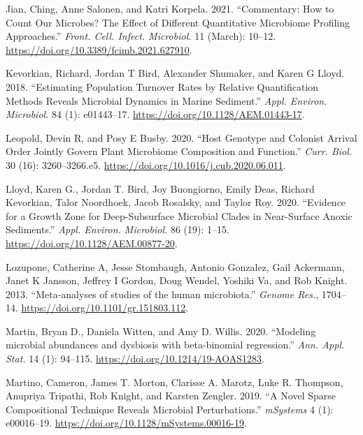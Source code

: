 \documentclass[
]{article}
\newlength{\cslhangindent}
\newlength{\cslentryspacingunit} %
\newenvironment{CSLReferences}[2] %
 {%
  \setlength{\parindent}{0pt}
  \ifodd #1
  \let\oldpar\par
  \def\par{\hangindent=\cslhangindent\oldpar}
  \fi
  \setlength{\parskip}{#2\cslentryspacingunit}
 }%
 {}
\theoremstyle{definition}
\theoremstyle{definition}
\theoremstyle{definition}
\theoremstyle{definition}
\theoremstyle{remark}
\begin{document}
\begin{CSLReferences}{1}{0}
\leavevmode{}%
Jian, Ching, Anne Salonen, and Katri Korpela. 2021. {``{Commentary: How to Count Our Microbes? The Effect of Different Quantitative Microbiome Profiling Approaches}.''} \emph{Front. Cell. Infect. Microbiol.} 11 (March): 10--12. \url{https://doi.org/10.3389/fcimb.2021.627910}.

\leavevmode{}%
Kevorkian, Richard, Jordan T Bird, Alexander Shumaker, and Karen G Lloyd. 2018. {``{Estimating Population Turnover Rates by Relative Quantification Methods Reveals Microbial Dynamics in Marine Sediment}.''} \emph{Appl. Environ. Microbiol.} 84 (1): e01443--17. \url{https://doi.org/10.1128/AEM.01443-17}.

\leavevmode{}%
Leopold, Devin R, and Posy E Busby. 2020. {``{Host Genotype and Colonist Arrival Order Jointly Govern Plant Microbiome Composition and Function}.''} \emph{Curr. Biol.} 30 (16): 3260--3266.e5. \url{https://doi.org/10.1016/j.cub.2020.06.011}.

\leavevmode{}%
Lloyd, Karen G., Jordan T. Bird, Joy Buongiorno, Emily Deas, Richard Kevorkian, Talor Noordhoek, Jacob Rosalsky, and Taylor Roy. 2020. {``{Evidence for a Growth Zone for Deep-Subsurface Microbial Clades in Near-Surface Anoxic Sediments}.''} \emph{Appl. Environ. Microbiol.} 86 (19): 1--15. \url{https://doi.org/10.1128/AEM.00877-20}.

\leavevmode{}%
Lozupone, Catherine A, Jesse Stombaugh, Antonio Gonzalez, Gail Ackermann, Janet K Jansson, Jeffrey I Gordon, Doug Wendel, Yoshiki Va, and Rob Knight. 2013. {``{Meta-analyses of studies of the human microbiota}.''} \emph{Genome Res.}, 1704--14. \url{https://doi.org/10.1101/gr.151803.112}.

\leavevmode{}%
Martin, Bryan D., Daniela Witten, and Amy D. Willis. 2020. {``{Modeling microbial abundances and dysbiosis with beta-binomial regression}.''} \emph{Ann. Appl. Stat.} 14 (1): 94--115. \url{https://doi.org/10.1214/19-AOAS1283}.

\leavevmode{}%
Martino, Cameron, James T. Morton, Clarisse A. Marotz, Luke R. Thompson, Anupriya Tripathi, Rob Knight, and Karsten Zengler. 2019. {``{A Novel Sparse Compositional Technique Reveals Microbial Perturbations}.''} \emph{mSystems} 4 (1): e00016--19. \url{https://doi.org/10.1128/mSystems.00016-19}.


\end{CSLReferences}
\end{document}
